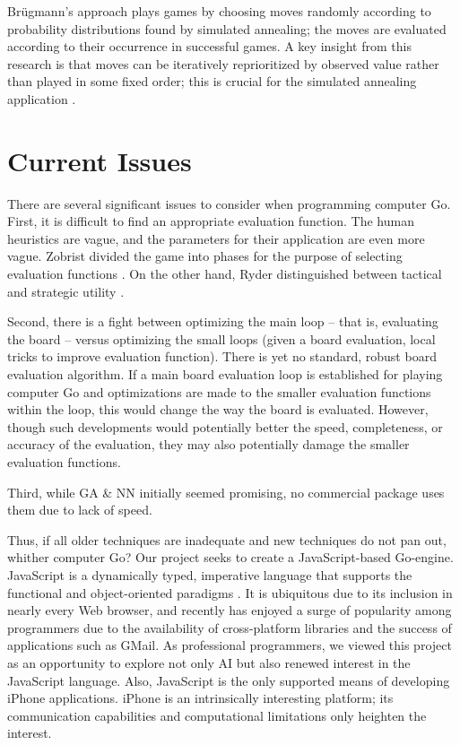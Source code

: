 \documentclass{memoir}
\begin{document}
Br\"ugmann's approach plays games by choosing moves randomly according to probability distributions found by simulated annealing; the moves are evaluated according to their occurrence in successful games. A key insight from this research is that moves can be iteratively reprioritized by observed value rather than played in some fixed order; this is crucial for the simulated annealing application \cite{Bruegmann93}.

\chapter{Current Issues}

There are several significant issues to consider when programming computer Go. First, it is difficult to find an appropriate evaluation function. The human heuristics are vague, and the parameters for their application  are even more vague. Zobrist divided the game into phases for the purpose of selecting evaluation functions \cite{Zobrist1970b}. On the other hand, Ryder distinguished between tactical and strategic utility \cite{Burmeister}.

Second, there is a fight between optimizing the main loop -- that is, evaluating the board -- versus optimizing the small loops (given a board evaluation, local tricks to improve evaluation function). There is yet no standard, robust board evaluation algorithm. If a main board evaluation loop is established for playing computer Go and optimizations are made to the smaller evaluation functions within the loop, this would change the way the board is evaluated.  However, though such developments would potentially better the speed, completeness, or accuracy of the evaluation, they may also potentially damage the smaller evaluation functions.

Third, while GA \& NN initially seemed promising, no commercial package uses them due to lack of speed.

Thus, if all older techniques are inadequate and new techniques do not pan out, whither computer Go? Our project seeks to create a JavaScript-based Go-engine. JavaScript is a dynamically typed, imperative language that supports the functional and object-oriented paradigms \cite{ECMA-262}. It is ubiquitous due to its inclusion in nearly every Web browser, and recently has enjoyed a surge of popularity among programmers due to the availability of cross-platform libraries and the success of applications such as GMail. As professional programmers, we viewed this project as an opportunity to explore not only AI but also renewed interest in the JavaScript language. Also, JavaScript is the only supported means of developing iPhone applications. iPhone is an intrinsically interesting platform; its communication capabilities and computational limitations only heighten the interest.
\end{document}
